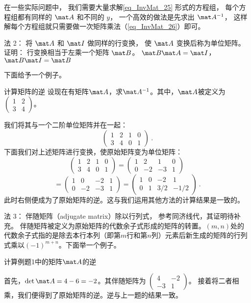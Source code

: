 在一些实际问题中， 我们需要大量求解\autoref{eq_InvMat_25} 形式的方程组， 每个方程组都有同样的 $\mat A$ 和不同的 $y$， 一个高效的做法是先求出 $\mat A^{-1}$， 这样解每个方程组就只需要做一次矩阵乘法（\autoref{eq_InvMat_26}）即可。

法 2： 将 $\mat A$ 和 $\mat I$ 做同样的行变换， 使 $\mat A$ 变换后称为单位矩阵。 
证明： 行变换相当于左乘一个矩阵 $\mat B$。 $\mat B\mat A = \mat I$， $\mat B \mat I = \mat B$

下面给予一个例子。
\begin{example}{计算矩阵的逆}
设现在有矩阵$\mat A$，求$\mat A^{-1}$。其中，$\mat A$被定义为
$
\left(
    \begin{matrix}
    1&2\\
    3&4
    \end{matrix}
\right)
$。
\end{example}
我们将其与一个二阶单位矩阵并在一起：
$$
\left(
    \begin{matrix}
    1&2&1&0\\
    3&4&0&1
    \end{matrix}
\right)~.
$$
下面我们对上述矩阵进行变换，使原始矩阵变为单位矩阵：
$$
\left(
    \begin{matrix}
    1&2&1&0\\
    3&4&0&1
    \end{matrix}\right)=\left(
    \begin{matrix}
    1&2&1&0\\
    0&-2&-3&1
    \end{matrix}\right)~$$
    $$
    =\left(
    \begin{matrix}
    1&0&-2&1\\
    0&-2&-3&1
    \end{matrix}\right)=\left(
    \begin{matrix}
    1&0&-2&1\\
    0&1&3/2&-1/2
    \end{matrix}
\right)~.
$$
此时右侧便成为了原始矩阵的逆。这与我们运用其他方法的计算结果是一致的。

法 3： 伴随矩阵（adjugate matrix）除以行列式， 参考同济线代，其证明待补充。%
伴随矩阵被定义为原始矩阵的代数余子式形成的矩阵的转置。$(m,n)$处的代数余子式指的是除去本行本列（即第$m$行和第$n$列）元素后新生成的矩阵的行列式乘以$(-1)^{m+n}$。下面举一个例子。
\begin{example}{计算例题1中的矩阵$\mat A$的逆}
\end{example}
首先，$\det\mat A=4-6=-2$。其伴随矩阵为 $\left(
\begin{matrix}
4&-2\\
-3&1
\end{matrix}
\right)
$。
接着将二者相乘，我们便得到了原始矩阵的逆。逆与上一题的结果一致。